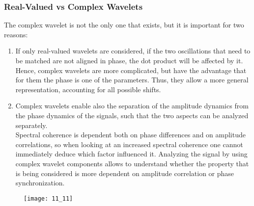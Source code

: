 \subsubsection{Real-Valued vs Complex Wavelets}
The complex wavelet is not the only one that exists, but it is important for two reasons:
\begin{enumerate}
    \item If only real-valued wavelets are considered, if the two oscillations that need to be matched are not
          aligned in phase, the dot product will be affected by it. Hence, complex wavelets are more
          complicated, but have the advantage that for them the phase is one of the parameters. Thus, they
          allow a more general representation, accounting for all possible shifts.
    \item Complex wavelets enable also the separation of the amplitude dynamics from the phase dynamics of the
          signals, such that the two aspects can be analyzed separately.\\
          Spectral coherence is dependent both on phase differences and on amplitude correlations, so when looking
          at an increased spectral coherence one cannot immediately deduce which factor influenced it.
          Analyzing the signal by using complex wavelet components allows to understand whether the property
          that is being considered is more dependent on amplitude correlation or phase synchronization.
\end{enumerate}
\begin{figure}[H]
    \texttt{[image: 11\_11]}
    \centering
\end{figure}
